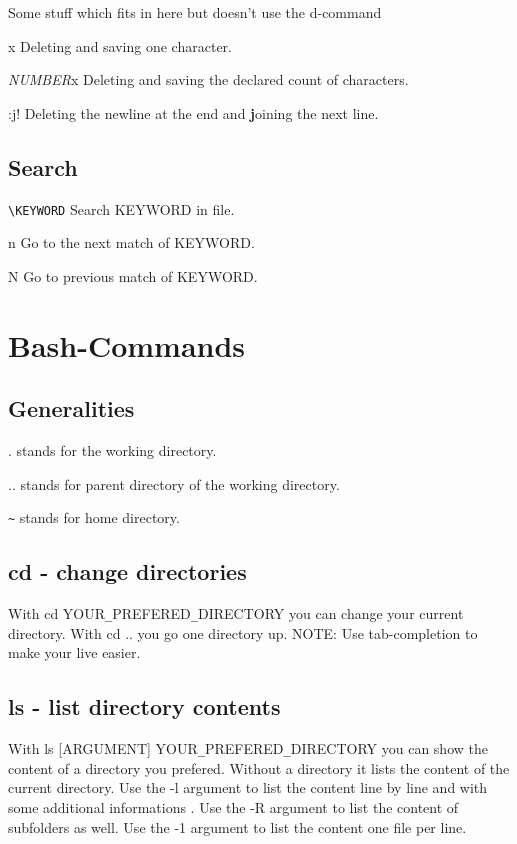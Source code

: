 \documentclass[10pt,a4paper]{scrartcl}
\begin{document}
\noindent Some stuff which fits in here but doesn't use the d-command
\begin{description}
\item{x} Deleting and saving one character.
\item{{\sl NUMBER}x} Deleting and saving the declared count of characters.
\item{:j!} Deleting the newline at the end and \textbf{j}oining the next line.
\end{description}

\subsection{Search}
\begin{description}
\item{\verb$\KEYWORD$} Search KEYWORD in file.
\item{n} Go to the next match of KEYWORD.
\item{N} Go to previous match of KEYWORD.
\end{description}
\section{Bash-Commands}

\subsection{Generalities}
\begin {description}
\item{.} stands for the working directory.
\item{..} stands for parent directory of the working directory.
\item{\verb$~$} stands for home directory.
\end {description}
\subsection{cd - change directories}

With cd YOUR\verb$_$PREFERED\verb$_$DIRECTORY you can change your current directory. With cd .. you go one directory up. NOTE: Use tab-completion to make your live easier.

\subsection{ls - list directory contents}

With ls [ARGUMENT] YOUR\verb$_$PREFERED\verb$_$DIRECTORY you can show the content of a directory you prefered. Without a directory it lists the content of the current directory. Use the -l argument to list the content line by line and with some additional informations . Use the -R argument to list the content of subfolders as well. Use the -1 argument to list the content one file per line. 
\end{document}
